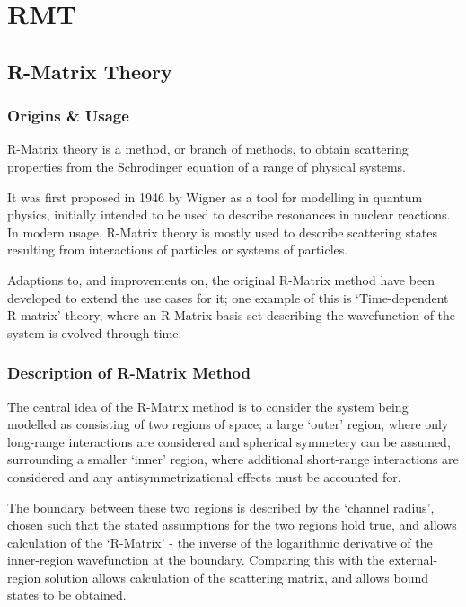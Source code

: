 
\chapter{RMT} %

\label{Chapter5} %

\section{R-Matrix Theory}
\subsection{Origins \& Usage}
R-Matrix theory\cite{Rmat} is a method, or branch of methods, to obtain scattering properties from the Schrodinger equation of a range of physical systems. 

It was first proposed in 1946 by Wigner\cite{Wigner} as a tool for modelling in quantum physics, initially intended to be used to describe resonances in nuclear reactions. In modern usage, R-Matrix theory is mostly used to describe scattering states resulting from interactions of particles or systems of particles. 

Adaptions to, and improvements on, the original R-Matrix method have been developed to extend the use cases for it; one example of this is `Time-dependent R-matrix' theory, where an R-Matrix basis set describing the wavefunction of the system is evolved through time. 

\subsection{Description of R-Matrix Method}
The central idea of the R-Matrix method is to consider the system being modelled as consisting of two regions of space; a large `outer' region, where only long-range interactions are considered and spherical symmetery can be assumed, surrounding a smaller `inner' region, where additional short-range interactions are considered and any antisymmetrizational effects must be accounted for. 

The boundary between these two regions is described by the `channel radius', chosen such that the stated assumptions for the two regions hold true, and allows calculation of the `R-Matrix' - the inverse of the logarithmic derivative of the inner-region wavefunction at the boundary. Comparing this with the external-region solution allows calculation of the scattering matrix, and allows bound states to be obtained.

